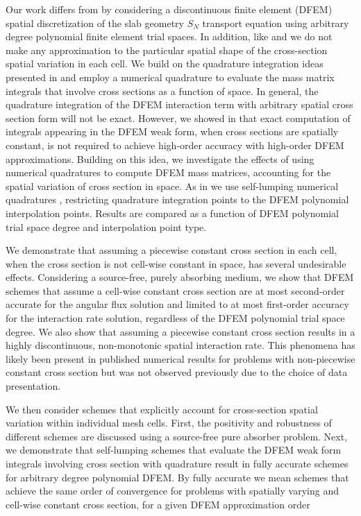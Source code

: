Our work differs from \cite{adams_scb,adams_nowak,varXS_diff,varXS_MOC} by considering a discontinuous finite element (DFEM) spatial discretization of the slab geometry $S_N$ transport equation using arbitrary degree polynomial finite element trial spaces.  
In addition, like \cite{adams_scb} and \cite{adams_nowak} we do not make any approximation to the particular spatial shape of the cross-section spatial variation in each cell.
We build on the quadrature integration ideas presented in  and employ a numerical quadrature to evaluate the mass matrix integrals that involve cross sections as a function of space.
In general, the quadrature integration of the DFEM interaction term with arbitrary spatial cross section form will not be exact.
However, we showed in  that exact computation of integrals appearing in the DFEM weak form, when cross sections are spatially constant, is not required to achieve high-order accuracy with high-order DFEM approximations.  
Building on this idea, we investigate the effects of using numerical quadratures to compute DFEM mass matrices, accounting for the spatial variation of cross section in space.
As in  we use self-lumping numerical quadratures \cite{raviart, thomee}, restricting quadrature integration points to the DFEM polynomial interpolation points.
Results are compared as a function of DFEM polynomial trial space degree and interpolation point type.

We demonstrate that assuming a piecewise constant cross section in each cell, when the cross section is not cell-wise constant in space, has several undesirable effects.  
Considering a source-free, purely absorbing medium, we show that DFEM schemes that assume a cell-wise constant cross section are at most second-order accurate for the angular flux solution and limited to at most first-order accuracy for the interaction rate solution, regardless of the DFEM polynomial trial space degree.  
We also show that assuming a piecewise constant cross section results in a highly discontinuous, non-monotonic spatial interaction rate.  
This phenomena has likely been present in published numerical results for problems with non-piecewise constant cross section but was not observed previously due to the choice of data presentation.

We then consider schemes that explicitly account for cross-section spatial variation within individual mesh cells.
First, the positivity and robustness of different schemes are discussed using a source-free pure absorber problem.
Next, we demonstrate that self-lumping schemes that evaluate the DFEM weak form integrals involving cross section with quadrature 
result in fully accurate schemes for arbitrary degree polynomial DFEM. 
By fully accurate we mean schemes that achieve the same order of convergence for problems with spatially varying and cell-wise constant cross section, for a given DFEM approximation order

